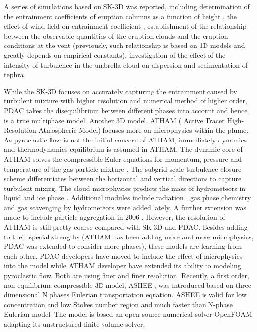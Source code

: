 \documentclass[journal abbreviation, manuscript]{copernicus}
\begin{document}
A series of simulations based on SK-3D was reported, including determination of the entrainment coefficients of eruption columns as a function of height \citep{suzuki2010numerical},  the effect of wind field on entrainment coefficient \citep{suzuki20133d}, establishment of the relationship between the observable quantities of the eruption clouds and the eruption conditions at the vent \citep{suzuki2009three} (previously, such relationship is based on 1D models and greatly depends on empirical constants), investigation of the effect of the intensity of turbulence in the umbrella cloud on dispersion and sedimentation of tephra \citep{koyaguchi2009effect}. 

While the SK-3D focuses on accurately capturing the entrainment caused by turbulent mixture with higher resolution and numerical method of higher order, PDAC takes the disequilibrium between different phases into account and hence is a true multiphase model. Another 3D model, ATHAM ( Active Tracer High-Resolution Atmospheric Model) \citep{oberhuber1998volcanic} focuses more on microphysics within the plume. As pyroclastic flow is not the initial concern of ATHAM, immediately dynamics and thermodynamics equilibrium is assumed in ATHAM. The dynamic core of ATHAM solves the compressible Euler equations for momentum, pressure and temperature of the gas particle mixture \citep{oberhuber1998volcanic}. The subgrid-scale turbulence closure scheme differentiates between the horizontal and vertical directions \citep{herzog2003prognostic} to capture turbulent mixing. The cloud microphysics predicts the mass of hydrometeors in liquid and ice phase \citep{herzog1998effect}. Additional modules include radiation \citep{langmann1997radiative}, gas phase chemistry \citep{trentmann2002simulation} and gas scavenging by hydrometeors \citep{textor2003injection} were added lately. A further extension was made to include particle aggregation in 2006 \citep{textor2006volcanic1, textor2006volcanic2}. However, the resolution of ATHAM is still pretty coarse compared with SK-3D and PDAC.
Besides adding to their special strengths (ATHAM has been adding more and more microphysics, PDAC was extended to consider more phases), these models are learning from each other. PDAC developers have moved to include the effect of microphysics into the model while ATHAM developer have extended its ability to modeling pyroclastic flow. Both are using finer and finer resolution. Recently, a first order, non-equilibrium compressible 3D model, ASHEE \citep{cerminara2016ashee}, was introduced based on three dimensional N phases Eulerian transportation equation. ASHEE is valid for low concentration and low Stokes number region and much faster than N-phase Eulerian model. The model is based an open source numerical solver OpenFOAM adapting its unstructured finite volume solver.
\end{document}
